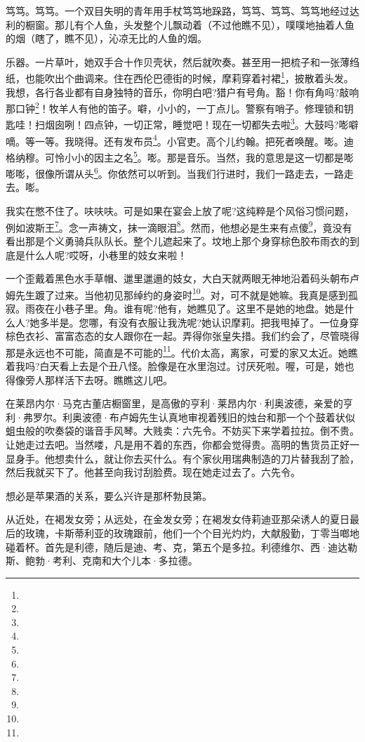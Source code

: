 \par 笃笃。笃笃。一个双目失明的青年用手杖笃笃地跺路，笃笃、笃笃、笃笃地经过达利的橱窗。那儿有个人鱼，头发整个儿飘动着（不过他瞧不见），噗噗地抽着人鱼的烟（瞎了，瞧不见），沁凉无比的人鱼的烟。
\par 乐器。一片草叶，她双手合十作贝壳状，然后就吹奏。甚至用一把梳子和一张薄绉纸，也能吹出个曲调来。住在西伦巴德街的时候，摩莉穿着衬裙\footnote{}，披散着头发。我想，各行各业都有自身独特的音乐，你明白吧?猎户有号角。豁！你有角吗?敲响那口钟\footnote{}！牧羊人有他的笛子。噼，小小的，一丁点儿。警察有哨子。修理锁和钥匙哇！扫烟囱咧！四点钟，一切正常，睡觉吧！现在一切都失去啦\footnote{}。大鼓吗?嘭噼嘀。等一等。我晓得。还有发布员\footnote{}。小官吏。高个儿约翰。把死者唤醒。嘭。迪格纳穆。可怜小小的因主之名\footnote{}。嘭。那是音乐。当然，我的意思是这一切都是嘭嘭嘭，很像所谓从头\footnote{}。你依然可以听到。当我们行进时，我们一路走去，一路走去。嘭。
\par 我实在憋不住了。呋呋呋。可是如果在宴会上放了呢?这纯粹是个风俗习惯问题，例如波斯王\footnote{}。念一声祷文，抹一滴眼泪\footnote{}。然而，他想必是生来有点傻\footnote{}，竟没有看出那是个义勇骑兵队队长。整个儿遮起来了。坟地上那个身穿棕色胶布雨衣的到底是什么人呢?哎呀，小巷里的妓女来啦！
\par 一个歪戴着黑色水手草帽、邋里邋遢的妓女，大白天就两眼无神地沿着码头朝布卢姆先生踱了过来。当他初见那绰约的身姿时\footnote{}。对，可不就是她嘛。我真是感到孤寂。雨夜在小巷子里。角。谁有呢?他有，她瞧见了。这里不是她的地盘。她是什么人?她多半是。您哪，有没有衣服让我洗呢?她认识摩莉。把我甩掉了。一位身穿棕色衣衫、富富态态的女人跟你在一起。弄得你张皇失措。我们约会了，尽管晓得那是永远也不可能，简直是不可能的\footnote{}。代价太高，离家，可爱的家又太近。她瞧着我吗?白天看上去是个丑八怪。脸像是在水里泡过。讨厌死啦。喔，可是，她也得像旁人那样活下去呀。瞧瞧这儿吧。
\par 在莱昂内尔·马克古董店橱窗里，是高傲的亨利·莱昂内尔·利奥波德，亲爱的亨利·弗罗尔。利奥波德·布卢姆先生认真地审视着残旧的烛台和那一个个鼓着状似蛆虫般的吹奏袋的谐音手风琴。大贱卖：六先令。不妨买下来学着拉拉。倒不贵。让她走过去吧。当然喽，凡是用不着的东西，你都会觉得贵。高明的售货员正好一显身手。他想卖什么，就让你去买什么。有个家伙用瑞典制造的刀片替我刮了脸，然后我就买下了。他甚至向我讨刮脸费。现在她走过去了。六先令。
\par 想必是苹果酒的关系，要么兴许是那杯勃艮第。
\par 从近处，在褐发女旁；从远处，在金发女旁；在褐发女侍莉迪亚那朵诱人的夏日最后的玫瑰，卡斯蒂利亚的玫瑰跟前，他们一个个目光灼灼，大献殷勤，丁零当啷地碰着杯。首先是利德，随后是迪、考、克，第五个是多拉。利德维尔、西·迪达勒斯、鲍勃·考利、克南和大个儿本·多拉德。
